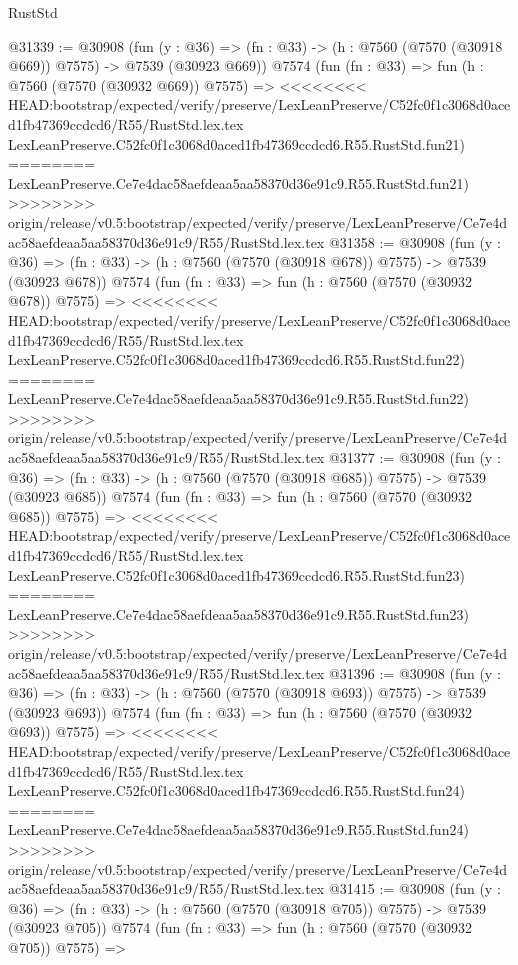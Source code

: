 \begin{lexlean}{RustStd}
\begin{coremodule}
{\begin{coremodule}
{{{{{{{{{{{{{{{{{{{{{{{{{{{{{{{{{{{{{{{{{{{@31339 := @30908
    (fun (y : @36) => (fn : @33) -> (h : @7560 (@7570 (@30918 @669)) @7575) -> @7539 (@30923 @669))
    @7574
    (fun (fn : @33) =>
    fun (h : @7560 (@7570 (@30932 @669)) @7575) =>
<<<<<<<< HEAD:bootstrap/expected/verify/preserve/LexLeanPreserve/C52fc0f1c3068d0aced1fb47369ccdcd6/R55/RustStd.lex.tex
    LexLeanPreserve.C52fc0f1c3068d0aced1fb47369ccdcd6.R55.RustStd.fun21)
========
    LexLeanPreserve.Ce7e4dac58aefdeaa5aa58370d36e91c9.R55.RustStd.fun21)
>>>>>>>> origin/release/v0.5:bootstrap/expected/verify/preserve/LexLeanPreserve/Ce7e4dac58aefdeaa5aa58370d36e91c9/R55/RustStd.lex.tex
@31358 := @30908
    (fun (y : @36) => (fn : @33) -> (h : @7560 (@7570 (@30918 @678)) @7575) -> @7539 (@30923 @678))
    @7574
    (fun (fn : @33) =>
    fun (h : @7560 (@7570 (@30932 @678)) @7575) =>
<<<<<<<< HEAD:bootstrap/expected/verify/preserve/LexLeanPreserve/C52fc0f1c3068d0aced1fb47369ccdcd6/R55/RustStd.lex.tex
    LexLeanPreserve.C52fc0f1c3068d0aced1fb47369ccdcd6.R55.RustStd.fun22)
========
    LexLeanPreserve.Ce7e4dac58aefdeaa5aa58370d36e91c9.R55.RustStd.fun22)
>>>>>>>> origin/release/v0.5:bootstrap/expected/verify/preserve/LexLeanPreserve/Ce7e4dac58aefdeaa5aa58370d36e91c9/R55/RustStd.lex.tex
@31377 := @30908
    (fun (y : @36) => (fn : @33) -> (h : @7560 (@7570 (@30918 @685)) @7575) -> @7539 (@30923 @685))
    @7574
    (fun (fn : @33) =>
    fun (h : @7560 (@7570 (@30932 @685)) @7575) =>
<<<<<<<< HEAD:bootstrap/expected/verify/preserve/LexLeanPreserve/C52fc0f1c3068d0aced1fb47369ccdcd6/R55/RustStd.lex.tex
    LexLeanPreserve.C52fc0f1c3068d0aced1fb47369ccdcd6.R55.RustStd.fun23)
========
    LexLeanPreserve.Ce7e4dac58aefdeaa5aa58370d36e91c9.R55.RustStd.fun23)
>>>>>>>> origin/release/v0.5:bootstrap/expected/verify/preserve/LexLeanPreserve/Ce7e4dac58aefdeaa5aa58370d36e91c9/R55/RustStd.lex.tex
@31396 := @30908
    (fun (y : @36) => (fn : @33) -> (h : @7560 (@7570 (@30918 @693)) @7575) -> @7539 (@30923 @693))
    @7574
    (fun (fn : @33) =>
    fun (h : @7560 (@7570 (@30932 @693)) @7575) =>
<<<<<<<< HEAD:bootstrap/expected/verify/preserve/LexLeanPreserve/C52fc0f1c3068d0aced1fb47369ccdcd6/R55/RustStd.lex.tex
    LexLeanPreserve.C52fc0f1c3068d0aced1fb47369ccdcd6.R55.RustStd.fun24)
========
    LexLeanPreserve.Ce7e4dac58aefdeaa5aa58370d36e91c9.R55.RustStd.fun24)
>>>>>>>> origin/release/v0.5:bootstrap/expected/verify/preserve/LexLeanPreserve/Ce7e4dac58aefdeaa5aa58370d36e91c9/R55/RustStd.lex.tex
@31415 := @30908
    (fun (y : @36) => (fn : @33) -> (h : @7560 (@7570 (@30918 @705)) @7575) -> @7539 (@30923 @705))
    @7574
    (fun (fn : @33) =>
    fun (h : @7560 (@7570 (@30932 @705)) @7575) =>
}}}}}}}}}}}}}}}}}}}}}}}}}}}}}}}}}}}}}}}}}}}
\end{coremodule}}
\end{coremodule}
\end{lexlean}
